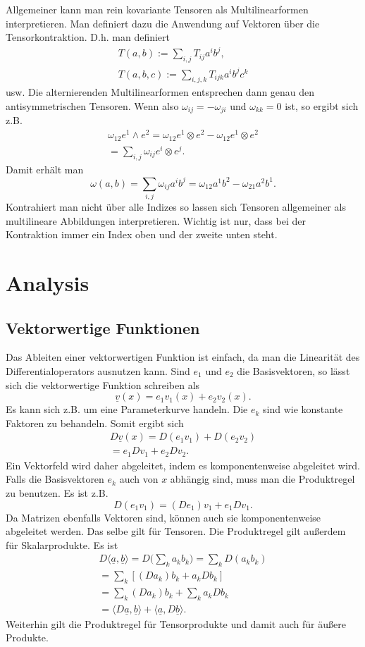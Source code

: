 \documentclass[a4paper,10pt,fleqn,twocolumn,twoside]{article}
\begin{document}
Allgemeiner kann man rein kovariante Tensoren als Multilinearformen
interpretieren. Man definiert dazu die Anwendung auf Vektoren über die
Tensorkontraktion. D.h. man definiert
\begin{gather*}
T(a,b) := \sum_{i,j} T_{ij}a^ib^j,\\
T(a,b,c) := \sum_{i,j,k} T_{ijk}a^ib^jc^k
\end{gather*}
usw. Die alternierenden Multilinearformen entsprechen dann genau
den antisymmetrischen Tensoren. Wenn also \(\omega_{ij}=-\omega_{ji}\)
und \(\omega_{kk}=0\) ist, so ergibt sich z.B.
\begin{gather*}
\omega_{12}e^1\wedge e^2
= \omega_{12}e^1\otimes e^2-\omega_{12}e^1\otimes e^2\\
= \sum_{i,j}\omega_{ij}e^i\otimes e^j.
\end{gather*}
Damit erhält man
\[\omega(a,b) = \sum_{i,j}\omega_{ij}a^ib^j
= \omega_{12}a^1b^2-\omega_{21}a^2b^1.\]
Kontrahiert man nicht über alle Indizes so lassen sich Tensoren
allgemeiner als multilineare Abbildungen interpretieren. Wichtig ist
nur, dass bei der Kontraktion immer ein Index oben und der zweite
unten steht.

\section{Analysis}
\subsection{Vektorwertige Funktionen}

Das Ableiten einer vektorwertigen Funktion ist einfach, da man
die Linearität des Differentialoperators ausnutzen kann. Sind \(e_1\)
und \(e_2\) die Basisvektoren, so lässt sich die vektorwertige
Funktion schreiben als
\[\underline v(x) = e_1v_1(x)+e_2v_2(x).\]
Es kann sich z.B. um eine Parameterkurve handeln. Die \(e_k\) sind
wie konstante Faktoren zu behandeln. Somit ergibt sich
\begin{gather*}
D\underline v(x) = D(e_1v_1)+D(e_2v_2)\\
= e_1Dv_1+e_2Dv_2.
\end{gather*}
Ein Vektorfeld wird daher abgeleitet, indem es komponentenweise
abgeleitet wird. Falls die Basisvektoren \(e_k\)
auch von \(x\) abhängig sind, muss man die Produktregel zu benutzen.
Es ist z.B.
\[D(e_1v_1) = (De_1)v_1+e_1Dv_1.\]
Da Matrizen ebenfalls Vektoren sind, können auch sie komponentenweise
abgeleitet werden. Das selbe gilt für Tensoren. Die Produktregel
gilt außerdem für Skalarprodukte. Es ist
\begin{gather*}D\langle\underline a,\underline b\rangle
= D\Big(\sum\nolimits_k a_kb_k\Big) = \sum\nolimits_k D(a_kb_k)\\
= \sum\nolimits_k [(Da_k)b_k+a_kDb_k]\\
= \sum\nolimits_k (Da_k)b_k + \sum\nolimits_k a_kDb_k\\
= \langle D\underline a,\underline b\rangle
+ \langle \underline a,D\underline b\rangle.
\end{gather*}
Weiterhin gilt die Produktregel für Tensorprodukte und damit auch
für äußere Produkte.
\end{document}
